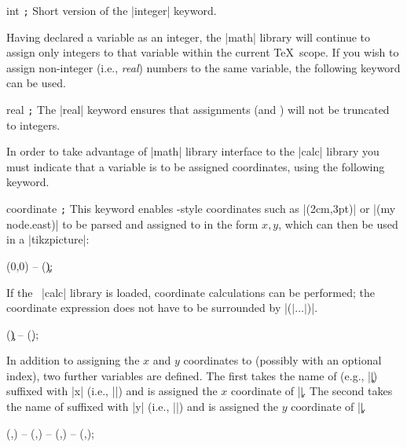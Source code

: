 \begin{math-keyword}{{int} \texttt{;}}
    Short version of the |integer| keyword.
\end{math-keyword}

Having declared a variable as an integer, the |math| library will continue to
assign only integers to that variable within the current \TeX\ scope. If you
wish to assign non-integer (i.e., \emph{real}) numbers to the same variable,
the following keyword can be used.

\begin{math-keyword}{{real} \texttt{;}}
    The |real| keyword ensures that assignments  (and
    ) will not be truncated to integers.
\end{math-keyword}

In order to take advantage of |math| library interface to the |calc| library
you must indicate that a variable is to be assigned coordinates, using the
following keyword.

\begin{math-keyword}{{coordinate} \texttt{;}}
    This keyword enables \tikzname-style coordinates such as |(2cm,3pt)| or
    |(my node.east)| to be parsed and assigned to  in the form
    $x,y$, which can then be used in a |tikzpicture|:
\begin{codeexample}[preamble={\usetikzlibrary{math}}]
\tikz\draw (0,0) -- (\c);
\end{codeexample}

    If the \tikzname\ |calc| library is loaded, coordinate calculations can be
    performed; the coordinate expression does not have to be surrounded by
    |($|\ldots|$)|.
\begin{codeexample}[preamble={\usetikzlibrary{math,calc}}]
\tikz\draw (\c) -- (\d);
\end{codeexample}

    In addition to assigning the $x$ and $y$ coordinates to 
    (possibly with an optional index), two further variables are defined. The
    first takes the name of  (e.g., |\c|) suffixed with |x|
    (i.e., |\cx|) and is assigned the $x$ coordinate of |\c|. The second takes
    the name of  suffixed with |y| (i.e., |\cy|) and is assigned
    the $y$ coordinate of |\c|.
\begin{codeexample}[preamble={\usetikzlibrary{math}}]
\tikz\draw (,) -- (,) -- (,) -- (,);
\end{codeexample}
\end{math-keyword}

